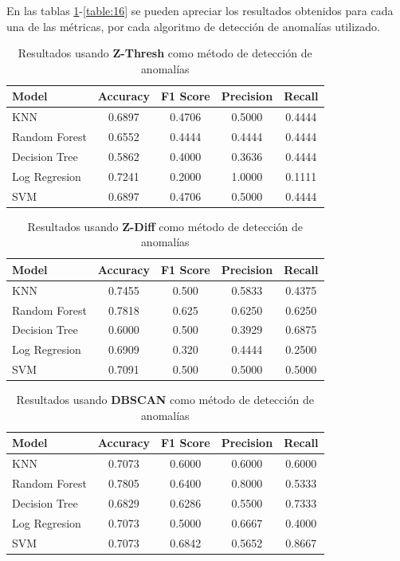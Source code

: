	En las tablas \ref{table:13}-\ref{table:16} se pueden apreciar los resultados obtenidos para cada una de las métricas, por cada algoritmo de detección de 
	anomalías utilizado.

	\begin{table}[htb]
		\centering
		\caption{Resultados usando \textbf{Z-Thresh} como método de detección de anomalías}
		\label{table:13}
		\begin{tabular}{lcccc}
		\toprule
				Model &  Accuracy &  F1 Score &  Precision &  Recall \\
		\midrule
				  KNN &    0.6897 &    0.4706 &     0.5000 &  0.4444 \\
		Random Forest &    0.6552 &    0.4444 &     0.4444 &  0.4444 \\
		Decision Tree &    0.5862 &    0.4000 &     0.3636 &  0.4444 \\
		Log Regresion &    0.7241 &    0.2000 &     1.0000 &  0.1111 \\
				  SVM &    0.6897 &    0.4706 &     0.5000 &  0.4444 \\
		\bottomrule
		\end{tabular}
	\end{table}

	\begin{table}[htb]
		\centering
		\caption{Resultados usando \textbf{Z-Diff} como método de detección de anomalías}
		\label{table:14}
		\begin{tabular}{lcccc}
		\toprule
				Model &  Accuracy &  F1 Score &  Precision &  Recall \\
		\midrule
				  KNN &    0.7455 &     0.500 &     0.5833 &  0.4375 \\
		Random Forest &    0.7818 &     0.625 &     0.6250 &  0.6250 \\
		Decision Tree &    0.6000 &     0.500 &     0.3929 &  0.6875 \\
		Log Regresion &    0.6909 &     0.320 &     0.4444 &  0.2500 \\
				  SVM &    0.7091 &     0.500 &     0.5000 &  0.5000 \\
		\bottomrule
		\end{tabular}
	\end{table}

	\begin{table}[htb]
		\centering
		\caption{Resultados usando \textbf{DBSCAN} como método de detección de anomalías}
		\label{table:15}
		\begin{tabular}{lcccc}
		\toprule
				Model &  Accuracy &  F1 Score &  Precision &  Recall \\
		\midrule
				  KNN &    0.7073 &    0.6000 &     0.6000 &  0.6000 \\
		Random Forest &    0.7805 &    0.6400 &     0.8000 &  0.5333 \\
		Decision Tree &    0.6829 &    0.6286 &     0.5500 &  0.7333 \\
		Log Regresion &    0.7073 &    0.5000 &     0.6667 &  0.4000 \\
				  SVM &    0.7073 &    0.6842 &     0.5652 &  0.8667 \\
		\bottomrule
		\end{tabular}
	\end{table}

